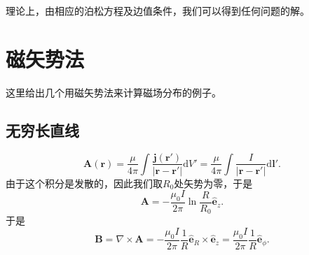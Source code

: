 \documentclass[UTF8]{ctexbook}
\renewcommand{\d}{\mathrm{d}}
\renewcommand{\b}{\boldsymbol}
\numberwithin{equation}{chapter}
\begin{document}
	理论上，由相应的泊松方程及边值条件，我们可以得到任何问题的解。
	
	\section{磁矢势法}
	这里给出几个用磁矢势法来计算磁场分布的例子。
	\subsection{无穷长直线}
	\begin{figure}[H]
		\centering
	\end{figure}
	\[\b{A}(\b{r})=\frac{\mu}{4\pi}\int \frac{\b{j}(\b{r}')}{|\b{r}-\b{r}'|}\d V' = \frac{\mu}{4\pi}\int \frac{I}{|\b{r}-\b{r}'|}\d \b{l}'.\]
	由于这个积分是发散的，因此我们取$R_0$处矢势为零，于是
	\[\b{A}=-\frac{\mu_0 I}{2\pi}\ln\frac{R}{R_0}\hat{\b{e}}_z.\]
	于是
	\[\b{B}=\nabla\times\b{A}=-\frac{\mu_0 I}{2\pi}\frac{1}{R}\hat{\b{e}}_R\times\hat{\b{e}}_z=\frac{\mu_0 I}{2\pi}\frac{1}{R}\hat{\b{e}}_\phi.\]
	
\end{document}

